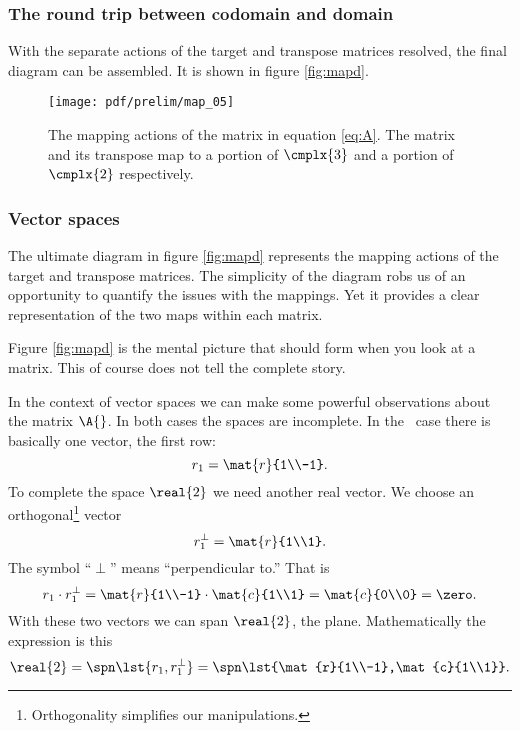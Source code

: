 \subsubsection{The round trip between codomain and domain}
With the separate actions of the target and transpose matrices resolved, the final diagram can be assembled. It is shown in figure \eqref{fig:mapd}.
\begin{figure}[htbp] %
   \centering
   \texttt{[image: pdf/prelim/map\_05]} 
   \caption[The mapping actions of the matrix in equation \eqref{eq:A}]{The mapping actions of the matrix in equation \eqref{eq:A}. The matrix and its transpose map to a portion of $\cmplx{3}$ and a portion of $\cmplx{2}$ respectively.}
   \label{fig:mapd}
\end{figure}

\subsubsection{Vector spaces}
The ultimate diagram in figure \eqref{fig:mapd} represents the mapping actions of the target and transpose matrices. The simplicity of the diagram robs us of an opportunity to quantify the issues with the mappings. Yet it provides a clear representation of the two maps within each matrix.

Figure \eqref{fig:mapd} is the mental picture that should form when you look at a matrix. This of course does not tell the complete story.

In the context of vector spaces we can make some powerful observations about the matrix $\A{}$. In both cases the spaces are incomplete. In the \vv \ case there is basically one vector, the first row:
\begin{equation}
  r_{1} = \mat{r}{1\\-1}.
\end{equation}
To complete the space $\real{2}$ we need another real vector. We choose an orthogonal\footnote{Orthogonality simplifies our manipulations.} vector
\begin{equation}
  r_{1}^{\perp} = \mat{r}{1\\1}.
\end{equation}
The symbol ``$\perp$'' means ``perpendicular to.'' That is
\begin{equation}
  r_{1}\cdot r_{1}^{\perp} = \mat{r}{1\\-1} \cdot \mat{c}{1\\1} = \mat{c}{0\\0} = \zero.
\end{equation}
With these two vectors we can span $\real{2}$, the plane. Mathematically the expression is this
\begin{equation}
  \real{2} = \spn \lst{r_{1},r_{1}^{\perp}} = \spn \lst{\mat{r}{1\\-1},\mat{c}{1\\1}}.
\end{equation}

